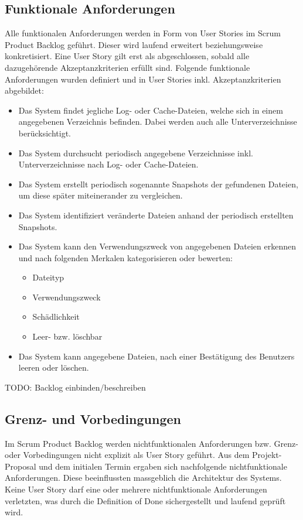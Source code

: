 \documentclass[a4paper,12pt]{report}
\begin{document}
    \subsection{Funktionale Anforderungen}

    Alle funktionalen Anforderungen werden in Form von User Stories im Scrum Product Backlog geführt. Dieser wird laufend erweitert beziehungsweise konkretisiert. Eine User Story gilt erst als abgeschlossen, sobald alle dazugehörende Akzeptanzkriterien erfüllt sind. Folgende funktionale Anforderungen wurden definiert und in User Stories inkl. Akzeptanzkriterien abgebildet:
    \begin{itemize}
        \item Das System findet jegliche Log- oder Cache-Dateien, welche sich in einem angegebenen Verzeichnis befinden. Dabei werden auch alle Unterverzeichnisse berücksichtigt.
        \item Das System durchsucht periodisch angegebene Verzeichnisse inkl. Unterverzeichnisse nach Log- oder Cache-Dateien.
        \item Das System erstellt periodisch sogenannte Snapshots der gefundenen Dateien, um diese später miteinerander zu vergleichen.
        \item Das System identifiziert veränderte Dateien anhand der periodisch erstellten Snapshots.
        \item Das System kann den Verwendungszweck von angegebenen Dateien erkennen und nach folgenden Merkalen kategorisieren oder bewerten:
        \begin{itemize}
            \item Dateityp
            \item Verwendungszweck
            \item Schädlichkeit
            \item Leer- bzw. löschbar
        \end{itemize}
        \item Das System kann angegebene Dateien, nach einer Bestätigung des Benutzers leeren oder löschen.
    \end{itemize}
    TODO: Backlog einbinden/beschreiben

    \newpage

    \subsection{Grenz- und Vorbedingungen}
    Im Scrum Product Backlog werden nichtfunktionalen Anforderungen bzw. Grenz- oder Vorbedingungen nicht explizit als User Story geführt. Aus dem Projekt-Proposal und dem initialen Termin ergaben sich nachfolgende nichtfunktionale Anforderungen.
    Diese beeinflussten massgeblich die Architektur des Systems. Keine User Story darf eine oder mehrere nichtfunktionale Anforderungen verletzten, was durch die Definition of Done sichergestellt und laufend geprüft wird.
\end{document}
